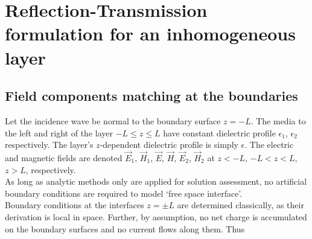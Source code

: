 \documentclass[twocolumn,secnumarabic,amssymb, nobibnotes, aps, prd]{revtex4-1}
\begin{document}
\section{Reflection-Transmission formulation for an inhomogeneous layer}
 

\subsection{Field components matching at the boundaries}

Let the incidence wave be normal to the boundary surface $z=-L$. The  media to the  left and right of the layer $-L \leq z \leq L$ have constant dielectric profile $\epsilon_{1}$, $\epsilon_2$ respectively. The layer's $z$-dependent dielectric profile is simply $\epsilon$. The electric and magnetic fields are denoted $\overrightarrow{E}_1$, $\overrightarrow{H}_1$, $\overrightarrow{E}$, $\overrightarrow{H}$, $\overrightarrow{E}_2$, $\overrightarrow{H}_2$ at $z<-L$, $-L<z<L$, $z>L$, respectively.\\ 
As long as analytic methods only are applied for solution assessment, no artificial boundary conditions are required to model `free space interface'.\\
Boundary conditions at the interfaces $z= \pm L$ are determined classically, as their derivation is local in space. Further, by assumption, no net charge is accumulated on the boundary surfaces and no current flows along them. Thus
\end{document}
